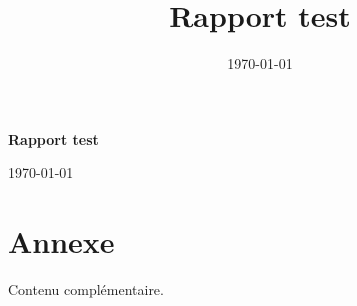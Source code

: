 \documentclass[11pt,a4paper]{report}
\title{Rapport test}
\author{}
\date{\today}
\begin{document}
\hypersetup{pageanchor=false}
\begin{titlepage}
  \centering
  {\large \par}
  \vspace*{4cm}
  {\Huge\bfseries Rapport test\par}
  \vspace{2cm}
  {\Large \par}
  \vfill
  {\large \today\par}
\end{titlepage}
\hypersetup{pageanchor=true}

\tableofcontents





\printbibliography[heading=bibintoc]

\appendix
\chapter{Annexe}
Contenu complémentaire.
\end{document}
